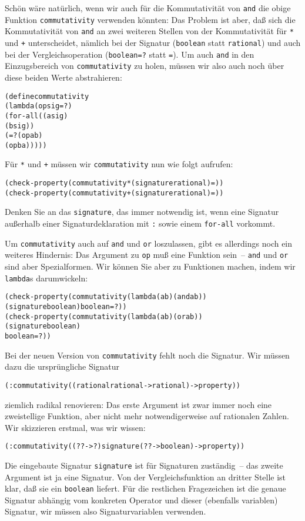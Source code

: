 Schön wäre natürlich, wenn wir auch für die Kommutativität von
\texttt{and} die obige Funktion \texttt{commutativity} verwenden
könnten: Das Problem ist aber, daß sich die Kommutativität von
\texttt{and} an zwei weiteren Stellen von der Kommutativität für
\texttt{*} und \texttt{+} unterscheidet, nämlich bei der Signatur
(\texttt{boolean} statt \texttt{rational}) und auch bei der
Vergleichsoperation (\texttt{boolean=?} statt \texttt{=}).  Um auch
\texttt{and} in den Einzugsbereich von \texttt{commutativity} zu
holen, müssen wir also auch noch über diese beiden Werte abstrahieren:
%
\begin{alltt}
(define commutativity
  (lambda (op sig =?)
    (for-all ((a sig)
              (b sig))
      (=? (op a b)
          (op b a)))))
\end{alltt}
%
Für \texttt{*} und \texttt{+} müssen wir \texttt{commutativity} nun
wie folgt aufrufen:
%
\begin{alltt}
(check-property (commutativity * (signature rational) =))
(check-property (commutativity + (signature rational) =))
\end{alltt}
%
Denken Sie an das \texttt{signature}, das immer notwendig ist, wenn
eine Signatur außerhalb einer Signaturdeklaration mit \texttt{:} sowie
einem \texttt{for-all} vorkommt.

Um \texttt{commutativity} auch auf \texttt{and} und \texttt{or}
loszulassen, gibt es allerdings noch ein weiteres Hindernis: Das
Argument zu \texttt{op} muß eine Funktion sein~-- \texttt{and} und
\texttt{or} sind aber Spezialformen.  Wir können Sie aber zu
Funktionen machen, indem wir \texttt{lambda}s darumwickeln:
%
\begin{alltt}
(check-property (commutativity (lambda (a b) (and a b))
                               (signature boolean) boolean=?))
(check-property (commutativity (lambda (a b) (or a b))
                               (signature boolean)
                               boolean=?))
\end{alltt}
%
Bei der neuen Version von \texttt{commutativity} fehlt noch die
Signatur.  Wir müssen dazu die ursprüngliche Signatur
%
\begin{alltt}
(: commutativity ((rational rational -> rational) -> property))
\end{alltt}
%
ziemlich radikal renovieren: Das erste Argument ist zwar immer noch
eine zweistellige Funktion, aber nicht mehr notwendigerweise auf
rationalen Zahlen.  Wir skizzieren erstmal, was wir wissen:
%
\begin{alltt}
(: commutativity ((? ? -> ?) signature (? ? -> boolean) -> property))
\end{alltt}
%
Die eingebaute Signatur \texttt{signature} ist für Signaturen
zuständig~-- das zweite Argument ist ja eine Signatur.  Von der
Vergleichsfunktion an dritter Stelle ist klar, daß sie ein
\texttt{boolean} liefert.  Für die restlichen Fragezeichen ist die
genaue Signatur abhängig vom konkreten Operator und dieser (ebenfalls
variablen) Signatur, wir müssen also Signaturvariablen verwenden.

